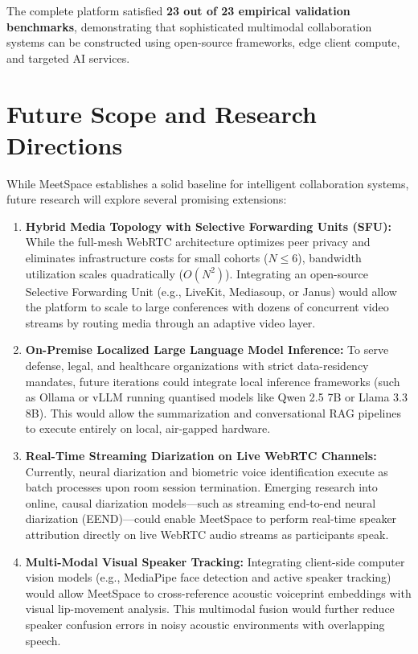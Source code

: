 \documentclass[12pt,oneside,letterpaper]{report}
\numberwithin{equation}{chapter} %
\begin{document}
The complete platform satisfied \textbf{23 out of 23 empirical validation benchmarks}, demonstrating that sophisticated multimodal collaboration systems can be constructed using open-source frameworks, edge client compute, and targeted AI services.

\section{Future Scope and Research Directions}
While MeetSpace establishes a solid baseline for intelligent collaboration systems, future research will explore several promising extensions:

\begin{enumerate}
    \item \textbf{Hybrid Media Topology with Selective Forwarding Units (SFU):} While the full-mesh WebRTC architecture optimizes peer privacy and eliminates infrastructure costs for small cohorts ($N \le 6$), bandwidth utilization scales quadratically ($O(N^2)$). Integrating an open-source Selective Forwarding Unit (e.g., LiveKit, Mediasoup, or Janus) would allow the platform to scale to large conferences with dozens of concurrent video streams by routing media through an adaptive video layer.
    
    \item \textbf{On-Premise Localized Large Language Model Inference:} To serve defense, legal, and healthcare organizations with strict data-residency mandates, future iterations could integrate local inference frameworks (such as Ollama or vLLM running quantised models like Qwen 2.5 7B or Llama 3.3 8B). This would allow the summarization and conversational RAG pipelines to execute entirely on local, air-gapped hardware.
    
    \item \textbf{Real-Time Streaming Diarization on Live WebRTC Channels:} Currently, neural diarization and biometric voice identification execute as batch processes upon room session termination. Emerging research into online, causal diarization models---such as streaming end-to-end neural diarization (EEND)---could enable MeetSpace to perform real-time speaker attribution directly on live WebRTC audio streams as participants speak.
    
    \item \textbf{Multi-Modal Visual Speaker Tracking:} Integrating client-side computer vision models (e.g., MediaPipe face detection and active speaker tracking) would allow MeetSpace to cross-reference acoustic voiceprint embeddings with visual lip-movement analysis. This multimodal fusion would further reduce speaker confusion errors in noisy acoustic environments with overlapping speech.
\end{enumerate}
\end{document}
